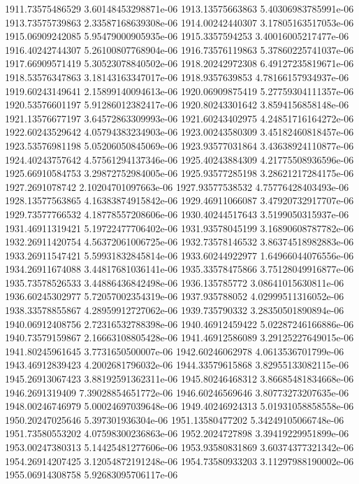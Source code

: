 {1911.73575486529 3.60148453298871e-06
1913.13575663863 5.40306983785991e-06
1913.73575739863 2.33587168639308e-06
1914.00242440307 3.17805163517053e-06
1915.06909242085 5.95479000905935e-06
1915.3357594253 3.40016005217477e-06
1916.40242744307 5.26100807768904e-06
1916.73576119863 5.37860225741037e-06
1917.66909571419 5.30523078840502e-06
1918.20242972308 6.49127235819671e-06
1918.53576347863 3.18143163347017e-06
1918.9357639853 4.78166157934937e-06
1919.60243149641 2.15899140094613e-06
1920.06909875419 5.27759304111357e-06
1920.53576601197 5.91286012382417e-06
1920.80243301642 3.8594156858148e-06
1921.13576677197 3.64572863309993e-06
1921.60243402975 4.24851716164272e-06
1922.60243529642 4.05794383234903e-06
1923.00243580309 3.45182460818457e-06
1923.53576981198 5.05206050845069e-06
1923.93577031864 3.43638924110877e-06
1924.40243757642 4.57561294137346e-06
1925.40243884309 4.21775508936596e-06
1925.66910584753 3.29872752984005e-06
1925.93577285198 3.28621217284175e-06
1927.2691078742 2.10204701097663e-06
1927.93577538532 4.75776428403493e-06
1928.13577563865 4.16383874915842e-06
1929.46911066087 3.47920732917707e-06
1929.73577766532 4.18778557208606e-06
1930.40244517643 3.5199050315937e-06
1931.46911319421 5.19722477706402e-06
1931.93578045199 3.16890608787782e-06
1932.26911420754 4.56372061006725e-06
1932.73578146532 3.86374518982883e-06
1933.26911547421 5.59931832845814e-06
1933.60244922977 1.64966044076556e-06
1934.26911674088 3.44817681036141e-06
1935.33578475866 3.75128049916877e-06
1935.73578526533 3.44886436842498e-06
1936.135785772 3.08641015630811e-06
1936.60245302977 5.72057002354319e-06
1937.935788052 4.02999511316052e-06
1938.33578855867 4.28959912727062e-06
1939.735790332 3.28350501890894e-06
1940.06912408756 2.72316532788398e-06
1940.46912459422 5.02287246166886e-06
1940.73579159867 2.16663108805428e-06
1941.46912586089 3.29125227649015e-06
1941.80245961645 3.7731650500007e-06
1942.60246062978 4.0613536701799e-06
1943.46912839423 4.2002681796032e-06
1944.33579615868 3.82955133082115e-06
1945.26913067423 3.88192591362311e-06
1945.80246468312 3.86685481834668e-06
1946.2691319409 7.39028854651772e-06
1946.60246569646 3.80773273207635e-06
1948.00246746979 5.00024697039648e-06
1949.40246924313 5.01931058858558e-06
1950.20247025646 5.397301936304e-06
1951.13580477202 5.34249105066748e-06
1951.73580553202 4.07598300236863e-06
1952.2024727898 3.39419229951899e-06
1953.00247380313 5.14425481277606e-06
1953.93580831869 3.60374377321342e-06
1954.26914207425 3.12054872191248e-06
1954.73580933203 3.11297988190002e-06
1955.06914308758 5.92683095706117e-06
}
